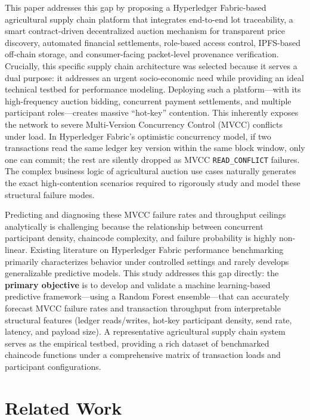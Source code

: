 \documentclass[manuscript,screen,nofonts]{acmart}
\begin{document}
	This paper addresses this gap by proposing a Hyperledger Fabric-based agricultural supply chain platform that integrates end-to-end lot traceability, a smart contract-driven decentralized auction mechanism for transparent price discovery, automated financial settlements, role-based access control, IPFS-based off-chain storage, and consumer-facing packet-level provenance verification. Crucially, this specific supply chain architecture was selected because it serves a dual purpose: it addresses an urgent socio-economic need while providing an ideal technical testbed for performance modeling. Deploying such a platform---with its high-frequency auction bidding, concurrent payment settlements, and multiple participant roles---creates massive ``hot-key'' contention. This inherently exposes the network to severe Multi-Version Concurrency Control (MVCC) conflicts under load. In Hyperledger Fabric's optimistic concurrency model, if two transactions read the same ledger key version within the same block window, only one can commit; the rest are silently dropped as MVCC \texttt{READ\_CONFLICT} failures. The complex business logic of agricultural auction use cases naturally generates the exact high-contention scenarios required to rigorously study and model these structural failure modes.

	Predicting and diagnosing these MVCC failure rates and throughput ceilings analytically is challenging because the relationship between concurrent participant density, chaincode complexity, and failure probability is highly non-linear. Existing literature on Hyperledger Fabric performance benchmarking primarily characterizes behavior under controlled settings and rarely develops generalizable predictive models. This study addresses this gap directly: the \textbf{primary objective} is to develop and validate a machine learning-based predictive framework---using a Random Forest ensemble---that can accurately forecast MVCC failure rates and transaction throughput from interpretable structural features (ledger reads/writes, hot-key participant density, send rate, latency, and payload size). A representative agricultural supply chain system serves as the empirical testbed, providing a rich dataset of benchmarked chaincode functions under a comprehensive matrix of transaction loads and participant configurations.
	
	
\section{Related Work}
\end{document}
